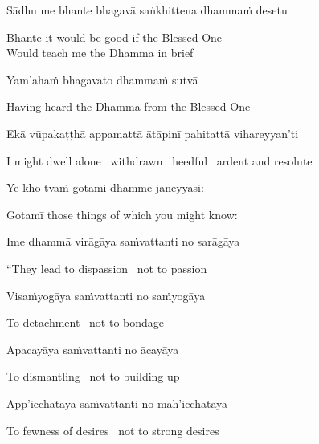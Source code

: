 \begin{pali-hang}
Sādhu me bhante bhagavā saṅkhittena dhammaṁ desetu
\end{pali-hang}

\begin{english}
  Bhante it would be good if the Blessed One\\
  Would teach me the Dhamma in brief
\end{english}

Yam'ahaṁ bhagavato dhammaṁ sutvā

\begin{english}
  Having heard the Dhamma from the Blessed One
\end{english}

\begin{pali-hang}
Ekā vūpakaṭṭhā appamattā ātāpinī pahitattā vihareyyan'ti
\end{pali-hang}

\begin{english-hang}
  I might dwell alone \breathmark\ withdrawn \breathmark\ heedful \breathmark\ ardent and resolute
\end{english-hang}

\ifninebythirteen\clearpage\fi

Ye kho tvaṁ gotami dhamme jāneyyāsi:

\begin{english}
  Gotamī those things of which you might know:
\end{english}

Ime dhammā virāgāya saṁvattanti no sarāgāya

\begin{english}
  ``They lead to dispassion \breathmark\ not to passion
\end{english}

Visaṁyogāya saṁvattanti no saṁyogāya

\begin{english}
  To detachment \breathmark\ not to bondage
\end{english}

Apacayāya saṁvattanti no ācayāya

\begin{english}
  To dismantling \breathmark\ not to building up
\end{english}

App'icchatāya saṁvattanti no mah'icchatāya

\begin{english}
  To fewness of desires \breathmark\ not to strong desires
\end{english}

